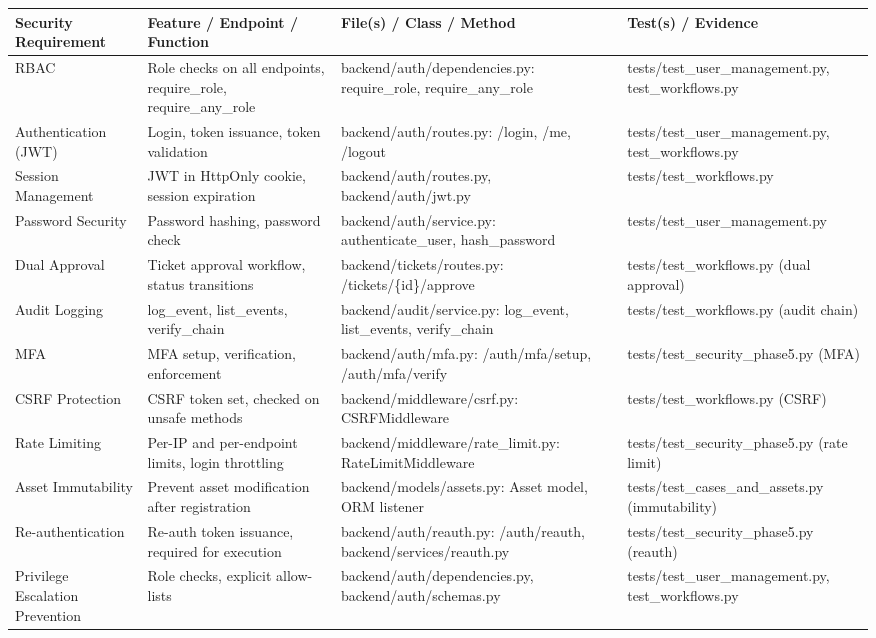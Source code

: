 \documentclass[12pt,a4paper]{report}
\begin{document}
\begin{longtable}{|p{3cm}|p{4cm}|p{5cm}|p{4cm}|}
\hline
\textbf{Security Requirement} & \textbf{Feature / Endpoint / Function} & \textbf{File(s) / Class / Method} & \textbf{Test(s) / Evidence} \\
\hline
RBAC & Role checks on all endpoints, require\_role, require\_any\_role & backend/auth/dependencies.py: require\_role, require\_any\_role & tests/test\_user\_management.py, test\_workflows.py \\
\hline
Authentication (JWT) & Login, token issuance, token validation & backend/auth/routes.py: /login, /me, /logout & tests/test\_user\_management.py, test\_workflows.py \\
\hline
Session Management & JWT in HttpOnly cookie, session expiration & backend/auth/routes.py, backend/auth/jwt.py & tests/test\_workflows.py \\
\hline
Password Security & Password hashing, password check & backend/auth/service.py: authenticate\_user, hash\_password & tests/test\_user\_management.py \\
\hline
Dual Approval & Ticket approval workflow, status transitions & backend/tickets/routes.py: /tickets/\{id\}/approve & tests/test\_workflows.py (dual approval) \\
\hline
Audit Logging & log\_event, list\_events, verify\_chain & backend/audit/service.py: log\_event, list\_events, verify\_chain & tests/test\_workflows.py (audit chain) \\
\hline
MFA & MFA setup, verification, enforcement & backend/auth/mfa.py: /auth/mfa/setup, /auth/mfa/verify & tests/test\_security\_phase5.py (MFA) \\
\hline
CSRF Protection & CSRF token set, checked on unsafe methods & backend/middleware/csrf.py: CSRFMiddleware & tests/test\_workflows.py (CSRF) \\
\hline
Rate Limiting & Per-IP and per-endpoint limits, login throttling & backend/middleware/rate\_limit.py: RateLimitMiddleware & tests/test\_security\_phase5.py (rate limit) \\
\hline
Asset Immutability & Prevent asset modification after registration & backend/models/assets.py: Asset model, ORM listener & tests/test\_cases\_and\_assets.py (immutability) \\
\hline
Re-authentication & Re-auth token issuance, required for execution & backend/auth/reauth.py: /auth/reauth, backend/services/reauth.py & tests/test\_security\_phase5.py (reauth) \\
\hline
Privilege Escalation Prevention & Role checks, explicit allow-lists & backend/auth/dependencies.py, backend/auth/schemas.py & tests/test\_user\_management.py, test\_workflows.py \\

\end{longtable}
\end{document}
